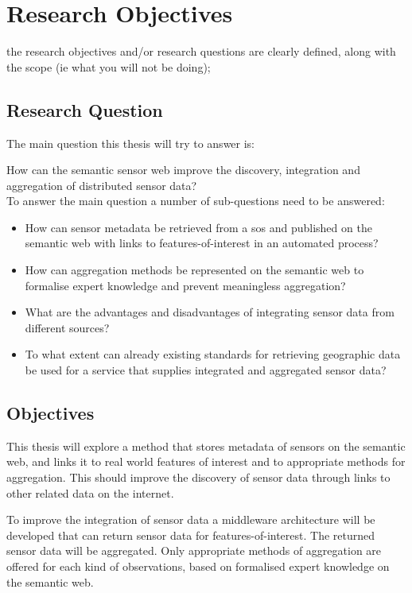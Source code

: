 
\chapter{Research Objectives}
\label{chap:objectives}

the research objectives and/or research questions are clearly defined, along with the scope (ie what you will not be doing);\\

\section{Research Question} 
The main question this thesis will try to answer is: 

How can the semantic sensor web improve the discovery, integration and 
aggregation of distributed sensor data?\\

To answer the main question a number of sub-questions need to be answered:
\begin{itemize}
	\item How can sensor metadata be retrieved from a \ac{sos} and published on the semantic web with links to features-of-interest in an automated process?
	\item How can aggregation methods be represented on the semantic web to formalise expert knowledge and prevent meaningless aggregation?
	\item What are the advantages and disadvantages of integrating sensor data from different sources?
	\item To what extent can already existing standards for retrieving geographic data be used for a service that supplies integrated and aggregated sensor data?
\end{itemize}

\section{Objectives}

This thesis will explore a method that stores metadata of sensors on the semantic web, and links it to real world features of interest and to appropriate methods for aggregation. This should improve the discovery of sensor data through links to other related data on the internet.  

To improve the integration of sensor data a middleware architecture will be developed that can return sensor data for features-of-interest. The returned sensor data will be aggregated. Only appropriate methods of aggregation are offered for each kind of observations, based on formalised expert knowledge on the semantic web.

